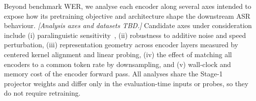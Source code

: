 
Beyond benchmark WER, we analyse each encoder along several axes intended to expose how its pretraining objective and architecture shape the downstream ASR behaviour.
\emph{[Analysis axes and datasets TBD.]}
Candidate axes under consideration include (i) paralinguistic sensitivity~\cite{FLM25,LSTN26}, (ii) robustness to additive noise and speed perturbation, (iii) representation geometry across encoder layers measured by centered kernel alignment and linear probing, (iv) the effect of matching all encoders to a common token rate by downsampling, and (v) wall-clock and memory cost of the encoder forward pass.
All analyses share the Stage-1 projector weights and differ only in the evaluation-time inputs or probes, so they do not require retraining.

